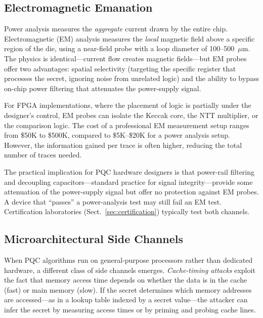 \subsection{Electromagnetic Emanation}
\label{subsec:em-emanation}

Power analysis measures the \emph{aggregate} current drawn by the entire chip.  Electromagnetic (EM) analysis measures the \emph{local} magnetic field above a specific region of the die, using a near-field probe with a loop diameter of 100--500~$\mu$m.  The physics is identical---current flow creates magnetic fields---but EM probes offer two advantages: spatial selectivity (targeting the specific register that processes the secret, ignoring noise from unrelated logic) and the ability to bypass on-chip power filtering that attenuates the power-supply signal.

For FPGA implementations, where the placement of logic is partially under the designer's control, EM probes can isolate the Keccak core, the NTT multiplier, or the comparison logic.  The cost of a professional EM measurement setup ranges from \$50K to \$500K, compared to \$5K--\$20K for a power analysis setup.  However, the information gained per trace is often higher, reducing the total number of traces needed.

The practical implication for PQC hardware designers is that power-rail filtering and decoupling capacitors---standard practice for signal integrity---provide some attenuation of the power-supply signal but offer no protection against EM probes.  A device that ``passes'' a power-analysis test may still fail an EM test.  Certification laboratories (Sect.~\ref{sec:certification}) typically test both channels.


\subsection{Microarchitectural Side Channels}
\label{subsec:cache-timing}

When PQC algorithms run on general-purpose processors rather than dedicated hardware, a different class of side channels emerges.  \emph{Cache-timing attacks} exploit the fact that memory access time depends on whether the data is in the cache (fast) or main memory (slow).  If the secret determines which memory addresses are accessed---as in a lookup table indexed by a secret value---the attacker can infer the secret by measuring access times or by priming and probing cache lines.

